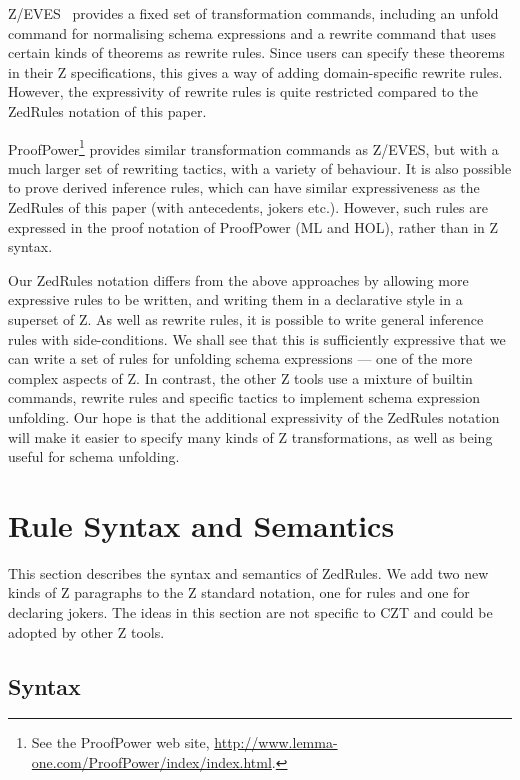 \documentclass{entcs}
\begin{document}
Z/EVES~\cite{zeves:98} provides a fixed set of transformation
commands, including an unfold command for normalising schema
expressions and a rewrite command that uses certain kinds of theorems
as rewrite rules.  Since users can specify these theorems in their Z
specifications, this gives a way of adding domain-specific rewrite
rules.  However, the expressivity of rewrite rules is quite restricted
compared to the ZedRules notation of this paper.

ProofPower\footnote{See the ProofPower web site,
  \url{http://www.lemma-one.com/ProofPower/index/index.html}.} provides
similar transformation commands as Z/EVES, but with a much larger set of
rewriting tactics, with a variety of behaviour.  It is also possible to
prove derived inference rules, which can have similar expressiveness as the
ZedRules of this paper (with antecedents, jokers etc.).  However, such
rules are expressed in the proof notation of ProofPower (ML and HOL),
rather than in Z syntax.

Our ZedRules notation differs from the above approaches by allowing more
expressive rules to be written, and writing them in a declarative style in
a superset of Z.  As well as rewrite rules, it is possible to write general
inference rules with side-conditions.  We shall see that this is
sufficiently expressive that we can write a set of rules for unfolding
schema expressions --- one of the more complex aspects of Z.  In contrast,
the other Z tools use a mixture of builtin commands, rewrite rules and
specific tactics to implement schema expression unfolding.  Our hope is
that the additional expressivity of the ZedRules notation will make it
easier to specify many kinds of Z transformations, as well as being useful
for schema unfolding.


\section{Rule Syntax and Semantics} \label{sec:syntax}

This section describes the syntax and semantics of ZedRules.  We add
two new kinds of Z paragraphs to the Z standard notation, one for
rules and one for declaring jokers.  The ideas in this section are not
specific to CZT and could be adopted by other Z tools.

\subsection{Syntax}
\end{document}
